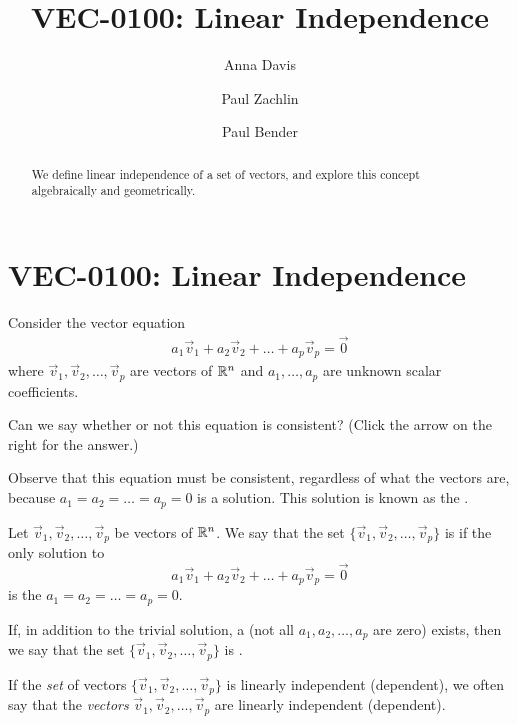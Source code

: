 \documentclass{ximera}
\author{Anna Davis \and Paul Zachlin \and Paul Bender} \title{VEC-0100: Linear Independence} \license{CC-BY 4.0}
\begin{document}
\begin{abstract}
 We define linear independence of a set of vectors, and explore this concept algebraically and geometrically.
\end{abstract}
\maketitle

\section*{VEC-0100: Linear Independence}

Consider the vector equation \begin{align}\label{eq:defoflinind}a_1\vec{v}_1+a_2\vec{v}_2+\ldots +a_p\vec{v}_p=\vec{0}\end{align}
 where $\vec{v}_1, \vec{v}_2,\ldots ,\vec{v}_p$ are vectors of $\mathbb{R}^n$ and $a_1, \ldots ,a_p$ are unknown scalar coefficients.  
 
 Can we say whether or not this equation is consistent?  (Click the arrow on the right for the answer.)
 
\begin{expandable}
Observe that this equation must be consistent, regardless of what the vectors are, because $a_1=a_2=\ldots =a_p=0$ is a solution.  This solution is known as the .
\end{expandable} 


\begin{definition}\label{def:linearindependence}
Let $\vec{v}_1, \vec{v}_2,\ldots ,\vec{v}_p$ be vectors of $\mathbb{R}^n$.  We say that the set $\{\vec{v}_1, \vec{v}_2,\ldots ,\vec{v}_p\}$ is  if the only solution to 
$$a_1\vec{v}_1+a_2\vec{v}_2+\ldots +a_p\vec{v}_p=\vec{0}$$
is the  $a_1=a_2=\ldots =a_p=0$.

If, in addition to the trivial solution, a  (not all $a_1, a_2,\ldots ,a_p$ are zero) exists, then we say that the set $\{\vec{v}_1, \vec{v}_2,\ldots ,\vec{v}_p\}$ is .
\end{definition}

If the {\it set} of vectors $\{\vec{v}_1, \vec{v}_2,\ldots ,\vec{v}_p\}$ is linearly independent (dependent), we often say that the {\it vectors} $\vec{v}_1, \vec{v}_2,\ldots ,\vec{v}_p$ are linearly independent (dependent).
\end{document}
